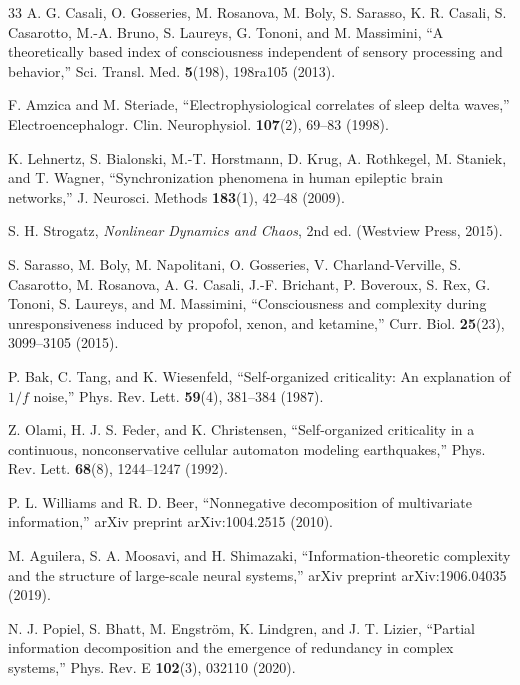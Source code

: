 \documentclass[aip,cha,reprint,amsmath,amssymb,final]{revtex4-2}
\begin{document}
\begin{thebibliography}{33}
 A. G. Casali, O. Gosseries, M. Rosanova, M. Boly, S. Sarasso, K. R. Casali, S. Casarotto, M.-A. Bruno, S. Laureys, G. Tononi, and M. Massimini, ``A theoretically based index of consciousness independent of sensory processing and behavior,'' Sci. Transl. Med. \textbf{5}(198), 198ra105 (2013).

 F. Amzica and M. Steriade, ``Electrophysiological correlates of sleep delta waves,'' Electroencephalogr. Clin. Neurophysiol. \textbf{107}(2), 69--83 (1998).

 K. Lehnertz, S. Bialonski, M.-T. Horstmann, D. Krug, A. Rothkegel, M. Staniek, and T. Wagner, ``Synchronization phenomena in human epileptic brain networks,'' J. Neurosci. Methods \textbf{183}(1), 42--48 (2009).

 S. H. Strogatz, \emph{Nonlinear Dynamics and Chaos}, 2nd ed. (Westview Press, 2015).

 S. Sarasso, M. Boly, M. Napolitani, O. Gosseries, V. Charland-Verville, S. Casarotto, M. Rosanova, A. G. Casali, J.-F. Brichant, P. Boveroux, S. Rex, G. Tononi, S. Laureys, and M. Massimini, ``Consciousness and complexity during unresponsiveness induced by propofol, xenon, and ketamine,'' Curr. Biol. \textbf{25}(23), 3099--3105 (2015).

 P. Bak, C. Tang, and K. Wiesenfeld, ``Self-organized criticality: An explanation of $1/f$ noise,'' Phys. Rev. Lett. \textbf{59}(4), 381--384 (1987).

 Z. Olami, H. J. S. Feder, and K. Christensen, ``Self-organized criticality in a continuous, nonconservative cellular automaton modeling earthquakes,'' Phys. Rev. Lett. \textbf{68}(8), 1244--1247 (1992).

 P. L. Williams and R. D. Beer, ``Nonnegative decomposition of multivariate information,'' arXiv preprint arXiv:1004.2515 (2010).

 M. Aguilera, S. A. Moosavi, and H. Shimazaki, ``Information-theoretic complexity and the structure of large-scale neural systems,'' arXiv preprint arXiv:1906.04035 (2019).

 N. J. Popiel, S. Bhatt, M. Engstr{\"o}m, K. Lindgren, and J. T. Lizier, ``Partial information decomposition and the emergence of redundancy in complex systems,'' Phys. Rev. E \textbf{102}(3), 032110 (2020).

\end{thebibliography}
\end{document}

